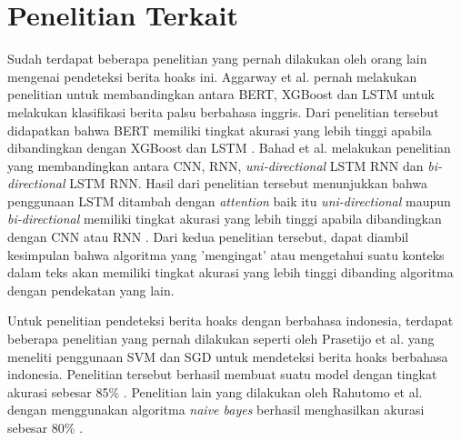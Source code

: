 \section{Penelitian Terkait}
\label{sec:penelitianterkait}

Sudah terdapat beberapa penelitian yang pernah dilakukan oleh orang lain mengenai pendeteksi berita hoaks ini. Aggarway et al. pernah melakukan penelitian untuk membandingkan antara BERT, XGBoost dan LSTM untuk melakukan klasifikasi berita palsu berbahasa inggris. Dari penelitian tersebut didapatkan bahwa BERT memiliki tingkat akurasi yang lebih tinggi apabila dibandingkan dengan XGBoost dan LSTM \cite{bert_news_classi}. Bahad et al. melakukan penelitian yang membandingkan antara CNN, RNN, \textit{uni-directional} LSTM RNN dan \textit{bi-directional} LSTM RNN. Hasil dari penelitian tersebut menunjukkan bahwa penggunaan LSTM ditambah dengan \textit{attention} baik itu \textit{uni-directional} maupun \textit{bi-directional} memiliki tingkat akurasi yang lebih tinggi apabila dibandingkan dengan CNN atau RNN \cite{bahad_lstm}. Dari kedua penelitian tersebut, dapat diambil kesimpulan bahwa algoritma yang 'mengingat' atau mengetahui suatu konteks dalam teks akan memiliki tingkat akurasi yang lebih tinggi dibanding algoritma dengan pendekatan yang lain.

Untuk penelitian pendeteksi berita hoaks dengan berbahasa indonesia, terdapat beberapa penelitian yang pernah dilakukan seperti oleh Prasetijo et al. yang meneliti penggunaan SVM dan SGD untuk mendeteksi berita hoaks berbahasa indonesia. Penelitian tersebut berhasil membuat suatu model dengan tingkat akurasi sebesar 85\% \cite{prasetijo}. Penelitian lain yang dilakukan oleh Rahutomo et al. dengan menggunakan algoritma \textit{naive bayes} berhasil menghasilkan akurasi sebesar 80\% \cite{rahutomo}.
